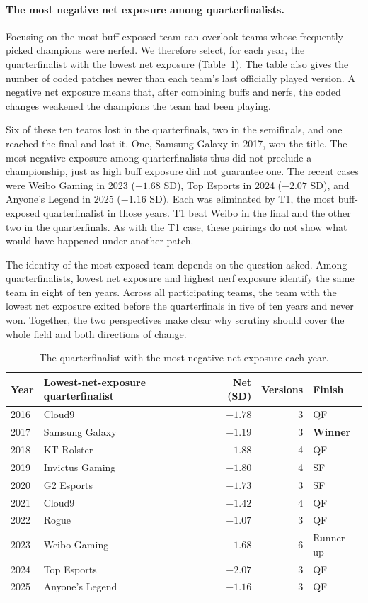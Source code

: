 \documentclass[11pt]{article}
\begin{document}
\paragraph{The most negative net exposure among quarterfinalists.}
Focusing on the most buff-exposed team can overlook teams whose frequently picked champions were nerfed. We therefore select, for each year, the quarterfinalist with the lowest net exposure (Table~\ref{tab:burden}). The table also gives the number of coded patches newer than each team's last officially played version. A negative net exposure means that, after combining buffs and nerfs, the coded changes weakened the champions the team had been playing.

Six of these ten teams lost in the quarterfinals, two in the semifinals, and one reached the final and lost it. One, Samsung Galaxy in 2017, won the title. The most negative exposure among quarterfinalists thus did not preclude a championship, just as high buff exposure did not guarantee one. The recent cases were Weibo Gaming in 2023 ($-1.68$ SD), Top Esports in 2024 ($-2.07$ SD), and Anyone's Legend in 2025 ($-1.16$ SD). Each was eliminated by T1, the most buff-exposed quarterfinalist in those years. T1 beat Weibo in the final and the other two in the quarterfinals. As with the T1 case, these pairings do not show what would have happened under another patch.

The identity of the most exposed team depends on the question asked. Among quarterfinalists, lowest net exposure and highest nerf exposure identify the same team in eight of ten years. Across all participating teams, the team with the lowest net exposure exited before the quarterfinals in five of ten years and never won. Together, the two perspectives make clear why scrutiny should cover the whole field and both directions of change.

\begin{table}[htbp]
\centering
\small
\caption{The quarterfinalist with the most negative net exposure each year.}
\label{tab:burden}
\begin{tabular}{llrrl}
\toprule
Year & Lowest-net-exposure quarterfinalist & Net (SD) & Versions & Finish \\
\midrule
2016 & Cloud9 & $-1.78$ & 3 & QF \\
2017 & Samsung Galaxy & $-1.19$ & 3 & \textbf{Winner} \\
2018 & KT Rolster & $-1.88$ & 4 & QF \\
2019 & Invictus Gaming & $-1.80$ & 4 & SF \\
2020 & G2 Esports & $-1.73$ & 3 & SF \\
2021 & Cloud9 & $-1.42$ & 4 & QF \\
2022 & Rogue & $-1.07$ & 3 & QF \\
2023 & Weibo Gaming & $-1.68$ & 6 & Runner-up \\
2024 & Top Esports & $-2.07$ & 3 & QF \\
2025 & Anyone's Legend & $-1.16$ & 3 & QF \\
\bottomrule
\end{tabular}
\end{table}
\end{document}
